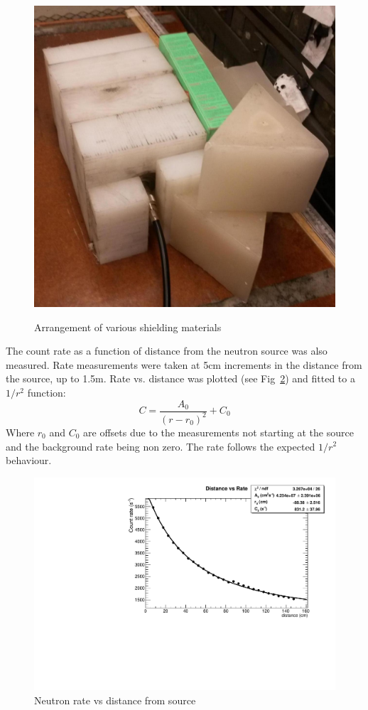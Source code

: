 \begin{figure}[hbt]
{		\includegraphics[scale=0.2]{images/All}
	}
	\caption{Arrangement of various shielding materials}	
	\label{fig:matTest}
\end{figure}
\clearpage


The count rate as a function of distance from the neutron source was also measured. Rate measurements were taken at 5cm increments in the distance from the source, up to 1.5m. Rate vs. distance was plotted (see Fig~\ref{fig:rateVsD}) and fitted to a $1/r^2$ function:
\begin{equation}
		{C=\frac{A_{0}}{\left ( r - r_{0} \right )^{2}}+C_{0}}
\end{equation}
Where $r_0$ and $C_0$ are offsets due to the measurements not starting at the source and the background rate being non zero. The rate follows the expected $1/r^2$ behaviour.


\begin{figure}[htb]
	\centerfloat
	\includegraphics[width=6in]{images/rate_vs_distance_fit}
	\caption{Neutron rate vs distance from source}	
	\label{fig:rateVsD}
\end{figure}


